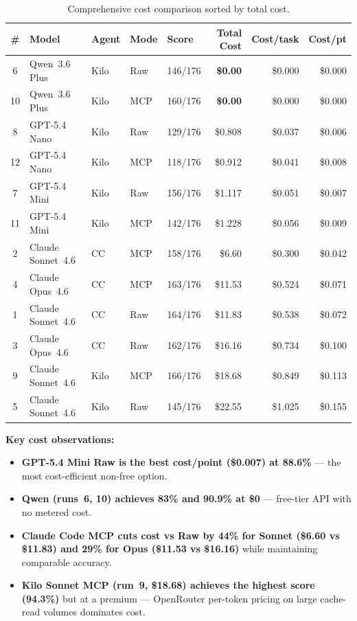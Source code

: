 \begin{table}[h]
\centering
\small
\caption{Comprehensive cost comparison sorted by total cost.}\label{tab:cost}
\setlength{\tabcolsep}{4pt}
\begin{tabular}{cllllrrr}
\toprule
\textbf{\#} & \textbf{Model} & \textbf{Agent} & \textbf{Mode}
  & \textbf{Score} & \textbf{Total Cost} & \textbf{Cost/task} & \textbf{Cost/pt} \\
\midrule
 6 & Qwen~3.6 Plus     & Kilo & Raw & 146/176 & \textbf{\$0.00}  & \$0.000 & \$0.000 \\
10 & Qwen~3.6 Plus     & Kilo & MCP & 160/176 & \textbf{\$0.00}  & \$0.000 & \$0.000 \\
 8 & GPT-5.4 Nano      & Kilo & Raw & 129/176 & \$0.808 & \$0.037 & \$0.006 \\
12 & GPT-5.4 Nano      & Kilo & MCP & 118/176 & \$0.912 & \$0.041 & \$0.008 \\
 7 & GPT-5.4 Mini      & Kilo & Raw & 156/176 & \$1.117 & \$0.051 & \$0.007 \\
11 & GPT-5.4 Mini      & Kilo & MCP & 142/176 & \$1.228 & \$0.056 & \$0.009 \\
 2 & Claude Sonnet~4.6 & CC   & MCP & 158/176 & \$6.60  & \$0.300 & \$0.042 \\
 4 & Claude Opus~4.6   & CC   & MCP & 163/176 & \$11.53 & \$0.524 & \$0.071 \\
 1 & Claude Sonnet~4.6 & CC   & Raw & 164/176 & \$11.83 & \$0.538 & \$0.072 \\
 3 & Claude Opus~4.6   & CC   & Raw & 162/176 & \$16.16 & \$0.734 & \$0.100 \\
 9 & Claude Sonnet~4.6 & Kilo & MCP & 166/176 & \$18.68 & \$0.849 & \$0.113 \\
 5 & Claude Sonnet~4.6 & Kilo & Raw & 145/176 & \$22.55 & \$1.025 & \$0.155 \\
\bottomrule
\end{tabular}
\end{table}

\noindent
\textbf{Key cost observations:}
\begin{itemize}[nosep, leftmargin=*]
  \item \textbf{GPT-5.4 Mini Raw is the best cost/point (\$0.007) at 88.6\%} ---
        the most cost-efficient non-free option.
  \item \textbf{Qwen (runs~6, 10) achieves 83\% and 90.9\% at \$0} ---
        free-tier API with no metered cost.
  \item \textbf{Claude Code MCP cuts cost vs Raw by 44\% for Sonnet
        (\$6.60 vs \$11.83) and 29\% for Opus (\$11.53 vs \$16.16)} while
        maintaining comparable accuracy.
  \item \textbf{Kilo Sonnet MCP (run~9, \$18.68) achieves the highest score
        (94.3\%)} but at a premium --- OpenRouter per-token pricing on large
        cache-read volumes dominates cost.
\end{itemize}

